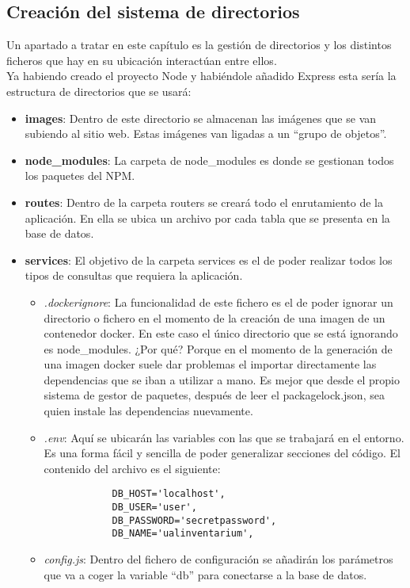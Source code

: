 \subsection{Creación del sistema de directorios}
Un apartado a tratar en este capítulo es la gestión de directorios y los distintos ficheros que hay en su ubicación interactúan entre ellos.
\\Ya habiendo creado el proyecto Node y habiéndole añadido Express esta sería la estructura de directorios que se usará:

\begin{itemize}
    \item \textbf{images}: Dentro de este directorio se almacenan las imágenes que se van subiendo al sitio web. Estas imágenes van ligadas a un ``grupo de objetos''.
    \item \textbf{node\_modules}: La carpeta de node\_modules es donde se gestionan todos los paquetes del NPM.
    \item \textbf{routes}: Dentro de la carpeta routers se creará todo el enrutamiento de la aplicación. En ella se ubica un archivo por cada tabla que se presenta en la base de datos.
    \item \textbf{services}: El objetivo de la carpeta services es el de poder realizar todos los tipos de consultas que requiera la aplicación.
          \begin{itemize}
              \item \textit{.dockerignore}: La funcionalidad de este fichero es el de poder ignorar un directorio o fichero en el momento de la creación de una imagen de un contenedor docker. En este caso el único directorio que se está ignorando es node\_modules. ¿Por qué? Porque en el momento de la generación de una imagen docker suele dar problemas el importar directamente las dependencias que se iban a utilizar a mano. Es mejor que desde el propio sistema de gestor de paquetes, después de leer el package\-lock.json, sea quien instale las dependencias nuevamente.
              \item \textit{.env}: Aquí se ubicarán las variables con las que se trabajará en el entorno. Es una forma fácil y sencilla de poder generalizar secciones del código. El contenido del archivo es el siguiente:
                    \begin{verbatim}
            DB_HOST='localhost',
            DB_USER='user',
            DB_PASSWORD='secretpassword',
            DB_NAME='ualinventarium',
        \end{verbatim}
              \item \textit{config.js}: Dentro del fichero de configuración se añadirán los parámetros que va a coger la variable ``db'' para conectarse a la base de datos.

\end{itemize}
\end{itemize}
